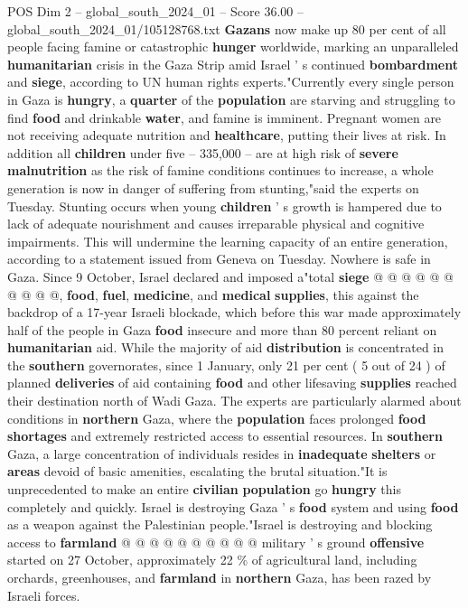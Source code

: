 \begin{textsample}{POS Dim 2 – global\_south\_2024\_01 – Score 36.00 – global\_south\_2024\_01/105128768.txt}  \label{ex:f2_pos_121}
\textbf{Gazans} now make up 80 per cent of all people facing famine or catastrophic \textbf{hunger} worldwide, marking an unparalleled \textbf{humanitarian} crisis in the Gaza Strip amid Israel ' s continued \textbf{bombardment} and \textbf{siege}, according to UN human rights experts."Currently every single person in Gaza is \textbf{hungry}, a \textbf{quarter} of the \textbf{population} are starving and struggling to find \textbf{food} and drinkable \textbf{water}, and famine is imminent.
Pregnant women are not receiving adequate nutrition and \textbf{healthcare}, putting their lives at risk.
In addition all \textbf{children} under five -- 335,000 -- are at high risk of \textbf{severe} \textbf{malnutrition} as the risk of famine conditions continues to increase, a whole generation is now in danger of suffering from stunting,"said the experts on Tuesday.
Stunting occurs when young \textbf{children} ' s growth is hampered due to lack of adequate nourishment and causes irreparable physical and cognitive impairments.
This will undermine the learning capacity of an entire generation, according to a statement issued from Geneva on Tuesday.
Nowhere is safe in Gaza.
Since 9 October, Israel declared and imposed a"total \textbf{siege} @ @ @ @ @ @ @ @ @ @, \textbf{food}, \textbf{fuel}, \textbf{medicine}, and \textbf{medical} \textbf{supplies}, this against the backdrop of a 17-year Israeli blockade, which before this war made approximately half of the people in Gaza \textbf{food} insecure and more than 80 percent reliant on \textbf{humanitarian} aid.
While the majority of aid \textbf{distribution} is concentrated in the \textbf{southern} governorates, since 1 January, only 21 per cent ( 5 out of 24 ) of planned \textbf{deliveries} of aid containing \textbf{food} and other lifesaving \textbf{supplies} reached their destination north of Wadi Gaza.
The experts are particularly alarmed about conditions in \textbf{northern} Gaza, where the \textbf{population} faces prolonged \textbf{food} \textbf{shortages} and extremely restricted access to essential resources.
In \textbf{southern} Gaza, a large concentration of individuals resides in \textbf{inadequate} \textbf{shelters} or \textbf{areas} devoid of basic amenities, escalating the brutal situation."It is unprecedented to make an entire \textbf{civilian} \textbf{population} go \textbf{hungry} this completely and quickly.
Israel is destroying Gaza ' s \textbf{food} system and using \textbf{food} as a weapon against the Palestinian people."Israel is destroying and blocking access to \textbf{farmland} @ @ @ @ @ @ @ @ @ @ military ' s ground \textbf{offensive} started on 27 October, approximately 22 \% of agricultural land, including orchards, greenhouses, and \textbf{farmland} in \textbf{northern} Gaza, has been razed by Israeli forces.

\end{textsample}

